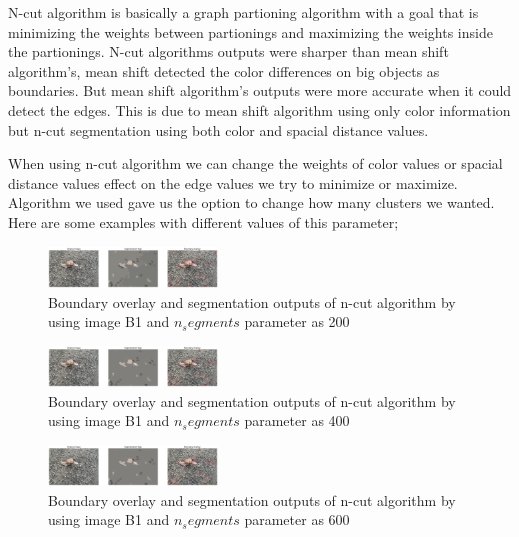 \documentclass[conference]{IEEEtran}
\begin{document}
N-cut algorithm is basically a graph partioning algorithm with a goal that is minimizing the weights between partionings and maximizing the weights inside the partionings. N-cut algorithms outputs were sharper than mean shift algorithm's, mean shift detected the color differences on big objects as boundaries. But mean shift algorithm's outputs were more accurate when it could detect the edges. This is due to mean shift algorithm using only color information but n-cut segmentation using both color and spacial distance values.

When using n-cut algorithm we can change the weights of color values or spacial distance values effect on the edge values we try to minimize or maximize. Algorithm we used gave us the option to change how many clusters we wanted. Here are some examples with different values of this parameter;

\begin{figure}[h]
        \centering
        \includegraphics[width=0.4\textwidth]{resources/snail_1.png}
        \caption{Boundary overlay and segmentation outputs of n-cut algorithm by using image B1 and $n_segments$ parameter as 200}
        \label{fig:snail_1}
    \end{figure}

\begin{figure}[h]
        \centering
        \includegraphics[width=0.4\textwidth]{resources/snail_2.png}
        \caption{Boundary overlay and segmentation outputs of n-cut algorithm by using image B1 and $n_segments$ parameter as 400}
        \label{fig:snail_2}
    \end{figure}

\begin{figure}[h]
        \centering 
        \includegraphics[width=0.4\textwidth]{resources/snail_3.png}
        \caption{Boundary overlay and segmentation outputs of n-cut algorithm by using image B1 and $n_segments$ parameter as 600}
        \label{fig:snail_3}
    \end{figure}
\end{document}
